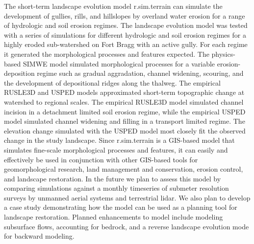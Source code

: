 \documentclass[gmd, manuscript]{copernicus}
\begin{document}
\conclusions

The short-term landscape evolution model 
r.sim.terrain can simulate the development of 
gullies, rills, and hillslopes by overland water erosion
for a range of hydrologic and soil erosion regimes.
The landscape evolution model was tested
with a series of simulations for different 
hydrologic and soil erosion regimes
for a highly eroded sub-watershed on Fort Bragg
with an active gully.
For each regime it generated the 
morphological processes and features expected.
The physics-based SIMWE model 
simulated morphological processes 
for a variable erosion-deposition regime such as 
gradual aggradation, channel widening, 
scouring, and the development of
depositional ridges along the thalweg.
The empirical RUSLE3D and USPED models
approximated short-term topographic change
at watershed to regional scales. 
The empirical RUSLE3D model simulated channel incision
in a detachment limited soil erosion regime,
while the empirical USPED model
simulated channel widening and filling
in a transport limited regime. 
The elevation change simulated with the USPED model
most closely fit the observed change in the study landscape.
Since r.sim.terrain is a GIS-based model 
that simulates fine-scale morphological processes and features,
it can easily and effectively be used 
in conjunction with other GIS-based tools
for geomorphological research,
land management and conservation,
erosion control, and landscape restoration. 
%
In the future we plan to assess this model
by comparing simulations against 
a monthly timeseries
of submeter resolution surveys
by unmanned aerial systems and terrestrial lidar. 
We also plan to develop a case study demonstrating
how the model can be used as a planning tool 
for landscape restoration. 
Planned enhancements to model include 
modeling subsurface flows, 
accounting for bedrock, 
and a reverse landscape evolution mode
for backward modeling. 

\end{document}
